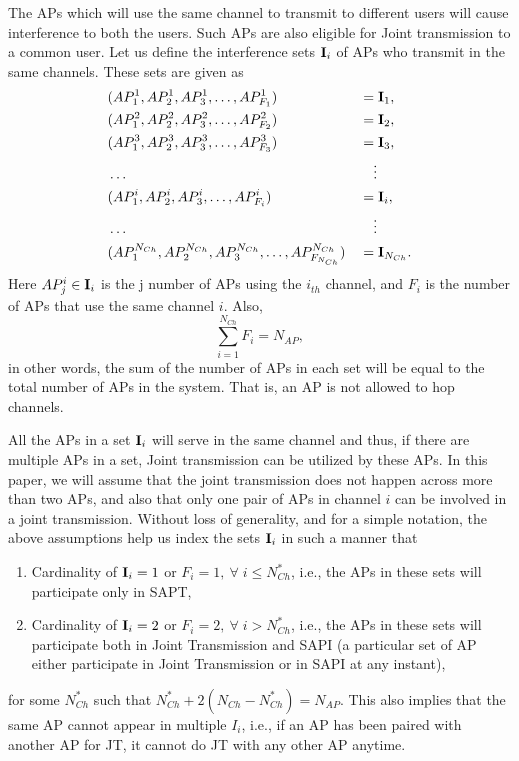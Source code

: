 The APs which will use the same channel to transmit to different users will cause interference to both the users. Such APs are also eligible for Joint transmission to a common user.
Let us define the interference sets $\mathbf{I}_i$ of APs who transmit in the same channels. These sets are given as
\begin{align*}
    & (AP_1^1,AP_2^1,AP_3^1,\ldots,AP_{F_1}^1) &&= \mathbf{I}_1,\\
    & (AP_1^2,AP_2^2,AP_3^2,\ldots,AP_{F_2}^2) &&= \mathbf{I}_2,\\
    & (AP_1^3,AP_2^3,AP_3^3,\ldots,AP_{F_3}^3) &&= \mathbf{I}_3,\\
    & \ldots&&\quad\vdots\\
    & (AP_1^i,AP_2^i,AP_3^i,\ldots,AP_{F_i}^i) &&= \mathbf{I}_i,\\
    & \ldots&&\quad\vdots\\
    & (AP_1^{N_{Ch}},AP_2^{N_{Ch}},AP_3^{N_{Ch}},\ldots,AP_{F_{N_{Ch}}}^{N_{Ch}})&& = \mathbf{I}_{N_{Ch}}.
\end{align*}
Here $AP_{j}^i \in \mathbf{I}_i$ is the j number of APs using the $i_{th}$ channel, and $F_i$ is the number of APs that use the same channel $i$. Also,
\begin{equation}
\label{eq:TotalAPs}
    \sum_{i=1}^{N_{Ch}} F_i = N_{AP},
\end{equation}
in other words, the sum of the number of APs in each set will be equal to the total number of APs in the system. That is, an AP is not allowed to hop channels.

All the APs in a set $\mathbf{I}_i$ will serve in the same channel and thus, if there are multiple APs in a set, Joint transmission can be utilized by these APs. 
In this paper, we will assume that the joint transmission does not happen across more than two APs, and also that only one pair of APs in channel $i$ can be involved in a joint transmission.
Without loss of generality, and for a simple notation, the above assumptions help us index the sets $\mathbf{I}_i$ in such a manner that
\begin{enumerate}
    \item Cardinality of $\mathbf{I}_i = 1$ or $F_i = 1, \: \forall \;i \leq N_{Ch}^*$, i.e., the APs in these sets will participate only in  SAPT,
    
    \item Cardinality of $\mathbf{I}_i = 2$ or $F_i = 2, \: \forall \;i > N_{Ch}^*$, i.e., the APs in these sets will participate both in Joint Transmission and SAPI (a particular set of AP either participate in Joint Transmission or in SAPI at any instant), 
\end{enumerate}
for some $N^*_{Ch}$ such that $N^*_{Ch}+2(N_{Ch}-N^*_{Ch}) = N_{AP}$. This also implies that the same AP cannot appear in multiple $I_i$, i.e., if an AP has been paired with another AP for JT, it cannot do JT with any other AP anytime.


